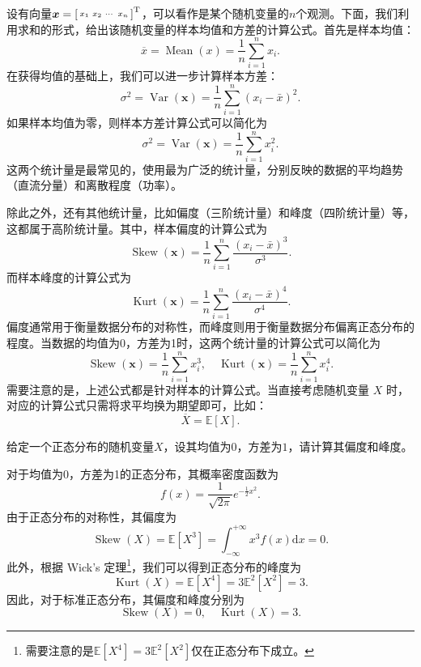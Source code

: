 设有向量\( \boldsymbol{x} = \begin{bsmallmatrix} x_1 & x_2 & \cdots & x_n \end{bsmallmatrix}^{\mathrm{T}} \)，可以看作是某个随机变量的\( n \)个观测。下面，我们利用求和的形式，给出该随机变量的样本均值和方差的计算公式。首先是样本均值：
\[
    \overline{x} = \operatorname{Mean}(x) = \frac{1}{n} \sum_{i=1}^n x_i.
\]
在获得均值的基础上，我们可以进一步计算样本方差：
\[
    \sigma^2 = \operatorname{Var}(\bm{x}) = \frac{1}{n} \sum_{i=1}^n (x_i - \bar{x})^2.
\]
如果样本均值为零，则样本方差计算公式可以简化为
\[
    \sigma^2 = \operatorname{Var}(\bm{x}) =  \frac{1}{n} \sum_{i=1}^n x_i^2.
\]
这两个统计量是最常见的，使用最为广泛的统计量，分别反映的数据的平均趋势（直流分量）和离散程度（功率）。

除此之外，还有其他统计量，比如偏度（三阶统计量）和峰度（四阶统计量）等，这都属于高阶统计量。其中，样本偏度的计算公式为
\[
    \operatorname{Skew}(\bm{x}) = \frac{1}{n} \sum_{i=1}^n \frac{(x_i - \bar{x})^3}{\sigma^3}.
\]
而样本峰度的计算公式为
\[
    \operatorname{Kurt}(\bm{x}) = \frac{1}{n} \sum_{i=1}^n \frac{(x_i - \bar{x})^4}{\sigma^4}.
\]
偏度通常用于衡量数据分布的对称性，而峰度则用于衡量数据分布偏离正态分布的程度。当数据的均值为0，方差为1时，这两个统计量的计算公式可以简化为
\[
    \operatorname{Skew}(\bm{x}) = \frac{1}{n} \sum_{i=1}^n x_i^3, \quad \operatorname{Kurt}(\bm{x}) = \frac{1}{n} \sum_{i=1}^n x_i^4.
\]
需要注意的是，上述公式都是针对样本的计算公式。当直接考虑随机变量 \( X \) 时，对应的计算公式只需将求平均换为期望即可，比如：
\[
    \overline{X} = \mathbb{E}[X].
\]

\begin{example}
    给定一个正态分布的随机变量\( X \)，设其均值为\( 0 \)，方差为\( 1 \)，请计算其偏度和峰度。
\end{example}
\begin{solution}
    对于均值为0，方差为1的正态分布，其概率密度函数为
    \[
        f(x) = \frac{1}{\sqrt{2\pi}} e^{-\frac{1}{2}x^2}.
    \]
    由于正态分布的对称性，其偏度为
    \[
        \operatorname{Skew}(X) = \mathbb{E}\left[X^3\right] = \int_{-\infty}^{+\infty} x^3 f(x) \mathrm{d}x = 0.
    \]
    此外，根据 Wick's 定理\footnote{需要注意的是\( \mathbb{E}\left[X^4\right] = 3 \mathbb{E}^2\left[ X^2 \right] \)仅在正态分布下成立。}，我们可以得到正态分布的峰度为
    \[
        \operatorname{Kurt}(X) = \mathbb{E}\left[X^4\right] = 3 \mathbb{E}^2\left[ X^2 \right] = 3.
    \]
    因此，对于标准正态分布，其偏度和峰度分别为
    \[
        \operatorname{Skew}(X) = 0, \quad \operatorname{Kurt}(X) = 3.
    \]
\end{solution}

